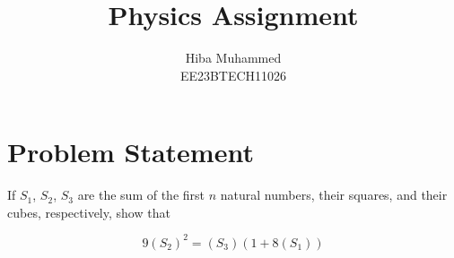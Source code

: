 \documentclass[12pt]{article}
\title{Physics Assignment}
\author{Hiba Muhammed \\
        EE23BTECH11026}
\begin{document}
    \maketitle

\section*{Problem Statement}
If \(S_1\), \(S_2\), \(S_3\) are the sum of the first \(n\) natural numbers, their squares, and their cubes, respectively, show that 

\[ 9(S_2)^2 = (S_3)(1 + 8(S_1)) \]
\end{document}
